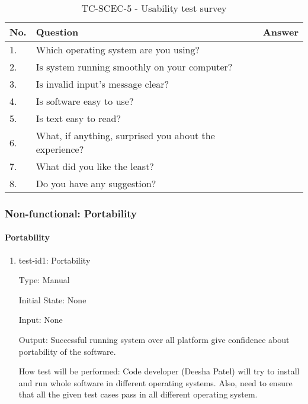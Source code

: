 \documentclass[12pt, titlepage]{article}
\begin{document}
\begin{table}[h!]
\begin{center}
\begin{tabular}{ p{0.5cm}|p{10cm}|c }
\hline
No. &  Question   & Answer \\
\hline
1. & Which operating system are you using?  & \\
2. & Is system running smoothly on your computer?  & \\
3. & Is invalid input's message clear?  &  \\
4. & Is software easy to use? & \\
5. & Is text easy to read? & \\
6. & What, if anything, surprised you about the experience? & \\
7. & What did you like the least? & \\
8. & Do you have any suggestion?  & \\

\hline
\end{tabular}
\caption{TC-SCEC-5 - Usability test survey}
\label{tab:tc-SCEC-5}
\end{center}
\end{table}

\subsubsection{Non-functional: Portability}
\label{non_functional_portability}		
\paragraph{Portability}

\begin{enumerate}
					
\item{test-id1: Portability\\}

Type: Manual
					
Initial State: None 
					
Input: None 
					
Output: Successful running system over all platform give confidence about portability of the software. 
					
How test will be performed: Code developer (Deesha Patel) will try to install and run whole software in different operating systems. Also, need to ensure that all the given test cases pass in all different operating system.  

\end{enumerate}
\end{document}
